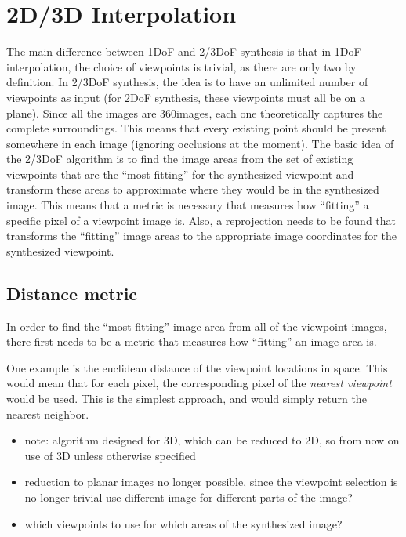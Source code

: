 \section{2D/3D Interpolation}
The main difference between 1DoF and 2/3DoF synthesis is that in 1DoF interpolation, the choice of viewpoints is trivial, as there are only two by definition. In 2/3DoF synthesis, the idea is to have an unlimited number of viewpoints as input (for 2DoF synthesis, these viewpoints must all be on a plane). Since all the images are 360\degree images, each one theoretically captures the complete surroundings. This means that every existing point should be present somewhere in each image (ignoring occlusions at the moment).
The basic idea of the 2/3DoF algorithm is to find the image areas from the set of existing viewpoints that are the ``most fitting'' for the synthesized viewpoint and transform these areas to approximate where they would be in the synthesized image. This means that a metric is necessary that measures how ``fitting'' a specific pixel of a viewpoint image is. Also, a reprojection needs to be found that transforms the ``fitting'' image areas to the appropriate image coordinates for the synthesized viewpoint.

\subsection{Distance metric}
In order to find the ``most fitting'' image area from all of the viewpoint images, there first needs to be a metric that measures how ``fitting'' an image area is. 

One example is the euclidean distance of the viewpoint locations in space. This would mean that for each pixel, the corresponding pixel of the \emph{nearest viewpoint} would be used. This is the simplest approach, and would simply return the nearest neighbor. 

\begin{itemize}
    \item note: algorithm designed for 3D, which can be reduced to 2D, so from now on use of 3D unless otherwise specified
    \item reduction to planar images no longer possible, since the viewpoint selection is no longer trivial \ar use different image for different parts of the image?
    \item which viewpoints to use for which areas of the synthesized image?
\end{itemize}

